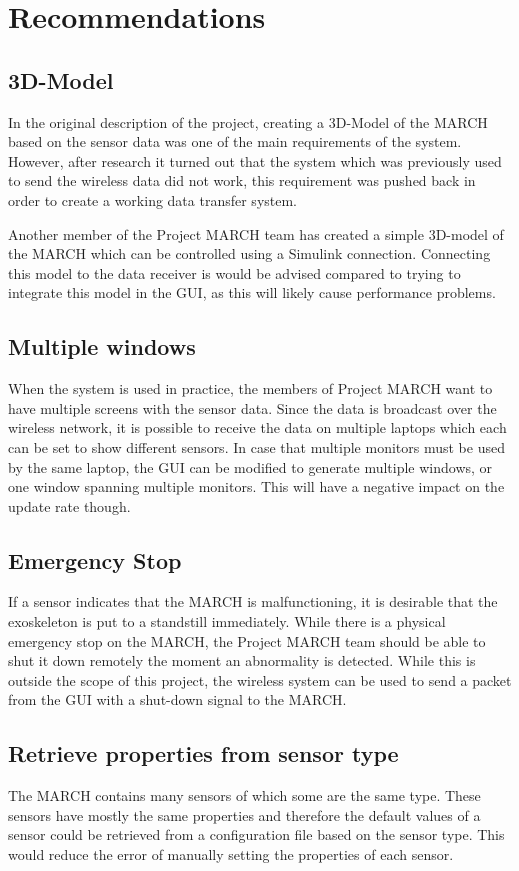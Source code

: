 \chapter{Recommendations}
\label{ch:rec}
\section{3D-Model}
In the original description of the project, creating a 3D-Model of the MARCH based on the sensor data was one of the main requirements of the system. However, after research it turned out that the system which was previously used to send the wireless data did not work, this requirement was pushed back in order to create a working data transfer system.  

Another member of the Project MARCH team has created a simple 3D-model of the MARCH which can be controlled using a Simulink connection. Connecting this model to the data receiver is would be advised compared to trying to integrate this model in the GUI, as this will likely cause performance problems.

\section{Multiple windows}
When the system is used in practice, the members of Project MARCH want to have multiple screens with the sensor data. Since the data is broadcast over the wireless network, it is possible to receive the data on multiple laptops which each can be set to show different sensors. In case that multiple monitors must be used by the same laptop, the GUI can be modified to generate multiple windows, or one window spanning multiple monitors. This will have a negative impact on the update rate though.

\section{Emergency Stop}
If a sensor indicates that the MARCH is malfunctioning, it is desirable that the exoskeleton is put to a standstill immediately. While there is a physical emergency stop on the MARCH, the Project MARCH team should be able to shut it down remotely the moment an abnormality is detected. While this is outside the scope of this project, the wireless system can be used to send a packet from the GUI with a shut-down signal to the MARCH. 

\section{Retrieve properties from sensor type}
The MARCH contains many sensors of which some are the same type. These sensors have mostly the same properties and therefore the default values of a sensor could be retrieved from a configuration file based on the sensor type. This would reduce the error of manually setting the properties of each sensor.


